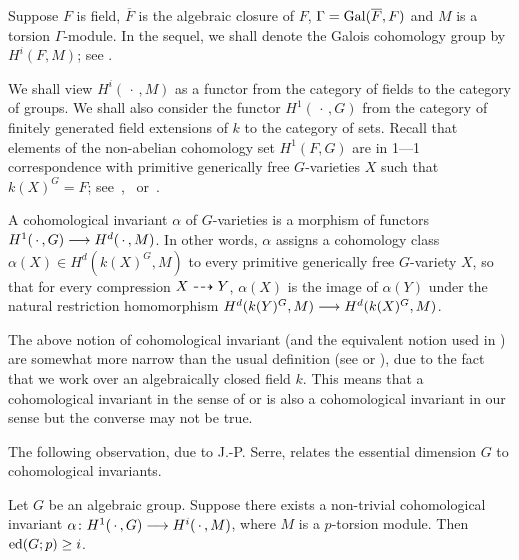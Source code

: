 Suppose $F$ is field, $\overline{F}$ is the algebraic closure of $F$, 
$\Gamma = \operatorname{Gal}(\overline{F}, F)$ and $M$ 
is a torsion $\Gamma$-module. In the sequel, we shall denote the
Galois cohomology group by $H^i(F, M)$; see \cite{serregc}. 

We shall view
$H^i(\, \cdot \, , M)$ as a functor from the category of fields to 
the category of groups. We shall also consider the functor
$H^1( \, \cdot \, , G)$ from the category of finitely generated field
extensions of $k$ to the category of sets. Recall that elements
of the non-abelian cohomology set $H^1(F, G)$ are 
in 1---1 correspondence with primitive
generically free $G$-varieties $X$ such that $k(X)^G = F$;
see~\cite[I.5.2]{serregc},~\cite[Theorem 1.3.3]{popov} 
or~\cite[Lemma 12.3]{r2}.

\begin{defn} \label{def.ci}
A cohomological invariant $\alpha$ of $G$-varieties
is a morphism of functors $H^1(\, \cdot \,, G) \longrightarrow H^d(\, \cdot \, , M)$. 
In other words, $\alpha$ assigns a cohomology class 
$\alpha(X) \in H^d(k(X)^G, M)$ to every primitive generically 
free $G$-variety $X$, so that for every compression $X \dasharrow Y$, 
$\alpha(X)$ is the image of $\alpha(Y)$ under the natural restriction 
homomorphism $H^d(k(Y)^G, M) \longrightarrow H^d(k(X)^G, M)$. 
\end{defn}

\begin{remark} \label{rem.ci1} The above notion of cohomological invariant
(and the equivalent notion used in \cite[Section 12]{r2})
are somewhat more narrow than the usual definition (see \cite[6.1]{serrepp}
or \cite[31B]{boi}), due to the fact that we work over an algebraically 
closed field $k$. This means
that a cohomological invariant in the sense of \cite[Section 6.2]{serrepp}
or \cite[Section 31B]{boi} is also a cohomological
invariant in our sense but the converse may not be true.
\end{remark}

The following observation, due to J.-P. Serre, relates
the essential dimension $G$ to cohomological invariants.

\begin{lem} \label{lem.ci} 
Let $G$ be an algebraic group. Suppose there exists 
a non-trivial cohomological invariant $\alpha\colon H^1(\, \cdot \,, G) \longrightarrow 
H^i(\, \cdot \, , M)$, where $M$ is a $p$-torsion module. Then
$\operatorname{ed}(G; p) \geq i$. 
\end{lem}

